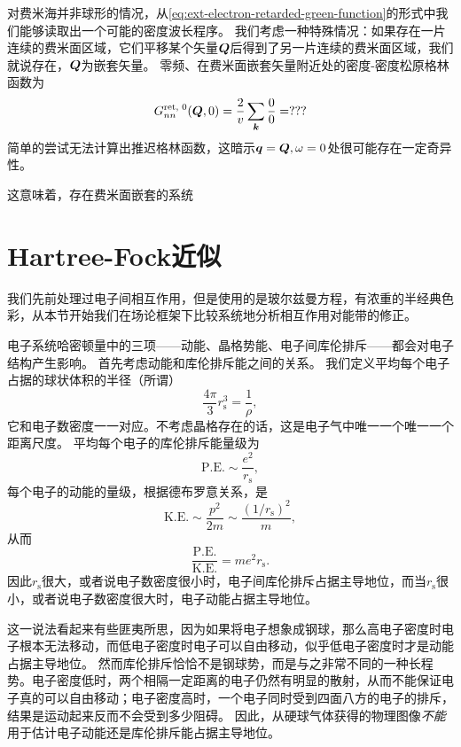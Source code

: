 对费米海并非球形的情况，从\eqref{eq:ext-electron-retarded-green-function}的形式中我们能够读取出一个可能的密度波长程序。
我们考虑一种特殊情况：如果存在一片连续的费米面区域，它们平移某个矢量$\vb*{Q}$后得到了另一片连续的费米面区域，我们就说存在，$\vb*{Q}$为嵌套矢量。
零频、在费米面嵌套矢量附近处的密度-密度松原格林函数为
\[
    G_{nn}^\text{ret, 0}(\vb*{Q}, 0) = \frac{2}{v} \sum_{\vb*{k}} \frac{0}{0} = ???
\]
简单的尝试无法计算出推迟格林函数，这暗示$\vb*{q} = \vb*{Q}, \omega = 0$处很可能存在一定奇异性。


这意味着，存在费米面嵌套的系统

\section{Hartree-Fock近似}\label{sec:hartree-fock-approximation}

我们先前处理过电子间相互作用，但是使用的是玻尔兹曼方程，有浓重的半经典色彩，从本节开始我们在场论框架下比较系统地分析相互作用对能带的修正。

电子系统哈密顿量中的三项——动能、晶格势能、电子间库伦排斥——都会对电子结构产生影响。
首先考虑动能和库伦排斥能之间的关系。
我们定义平均每个电子占据的球状体积的半径（所谓）
\begin{equation}
    \frac{4\pi}{3} r_\text{s}^3 = \frac{1}{\rho},
\end{equation}
它和电子数密度一一对应。不考虑晶格存在的话，这是电子气中唯一一个唯一一个距离尺度。
平均每个电子的库伦排斥能量级为
\[
    \text{P.E.} \sim \frac{e^2}{r_\text{s}},
\]
每个电子的动能的量级，根据德布罗意关系，是
\[
    \text{K.E.} \sim \frac{p^2}{2m} \sim \frac{(1/r_\text{s})^2}{m},
\]
从而
\begin{equation}
    \frac{\text{P.E.}}{\text{K.E.}} = me^2 r_\text{s}.
\end{equation}
因此$r_\text{s}$很大，或者说电子数密度很小时，电子间库伦排斥占据主导地位，而当$r_\text{s}$很小，或者说电子数密度很大时，电子动能占据主导地位。

这一说法看起来有些匪夷所思，因为如果将电子想象成钢球，那么高电子密度时电子根本无法移动，而低电子密度时电子可以自由移动，似乎低电子密度时才是动能占据主导地位。
然而库伦排斥恰恰不是钢球势，而是与之非常不同的一种长程势。电子密度低时，两个相隔一定距离的电子仍然有明显的散射，从而不能保证电子真的可以自由移动；电子密度高时，一个电子同时受到四面八方的电子的排斥，结果是运动起来反而不会受到多少阻碍。
因此，从硬球气体获得的物理图像\emph{不能}用于估计电子动能还是库伦排斥能占据主导地位。

